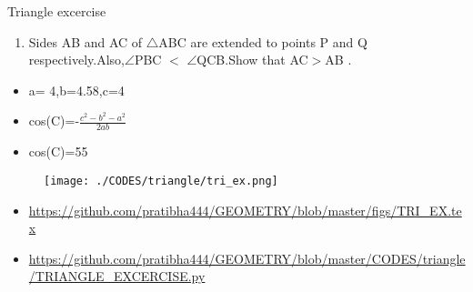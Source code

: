 \begin{frame}{Triangle excercise}
\begin{enumerate}
\item Sides AB and AC of $\triangle$ABC are extended to points P and Q respectively.Also,$\angle$PBC $<$ $\angle$QCB.Show that AC$>$AB .
\begin{center}

\end{center}
\end{enumerate}
\begin{itemize}
\item a= 4,b=4.58,c=4
\item cos(C)=-$\frac{c^2 - b^2 -a^2}{2ab}$
\item cos(C)=55

\seti
\end{itemize}
\end{frame}
\begin{frame}
\begin{center}
\begin{figure}
\texttt{[image: ./CODES/triangle/tri\_ex.png]}
\end{figure}
\end{center}
\begin{itemize}
\item \url{https://github.com/pratibha444/GEOMETRY/blob/master/figs/TRI_EX.tex}
\item \url{https://github.com/pratibha444/GEOMETRY/blob/master/CODES/triangle/TRIANGLE_EXCERCISE.py}
\end{itemize}
\end{frame}



